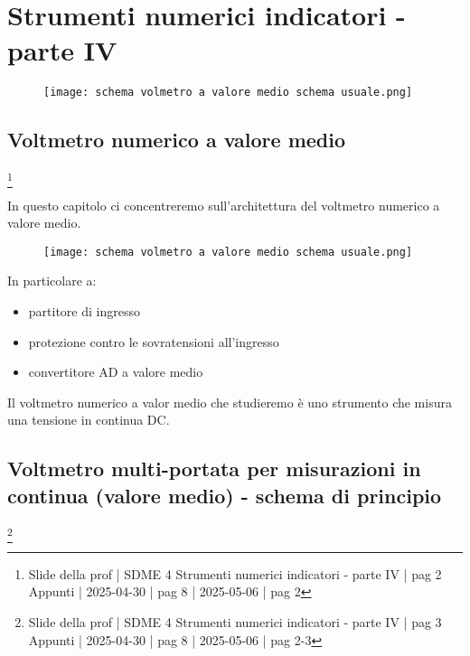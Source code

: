 \chapter{Strumenti numerici indicatori - parte IV}

\begin{figure}[h]
    \centering
    \texttt{[image: schema volmetro a valore medio schema usuale.png]}
\end{figure}

\newpage    

\section{Voltmetro numerico a valore medio}
\footnote{Slide della prof | SDME 4 Strumenti numerici indicatori - parte IV | pag 2 \\  
Appunti | 2025-04-30 | pag 8 | 2025-05-06 | pag 2}

In questo capitolo ci concentreremo sull'architettura del voltmetro numerico a valore medio. \newline 

\begin{figure}[h]
    \centering
    \texttt{[image: schema volmetro a valore medio schema usuale.png]}
\end{figure}

In particolare a: 

\begin{itemize}
    \item partitore di ingresso 
    \item protezione contro le sovratensioni all'ingresso 
    \item convertitore AD a valore medio
\end{itemize}

Il voltmetro numerico a valor medio che studieremo è uno strumento che misura una tensione in continua DC. \newline 

\newpage 

\section{Voltmetro multi-portata per misurazioni in continua (valore medio) - schema di principio}
\footnote{Slide della prof | SDME 4 Strumenti numerici indicatori - parte IV | pag 3 \\  
Appunti | 2025-04-30 | pag 8 | 2025-05-06 | pag 2-3}

